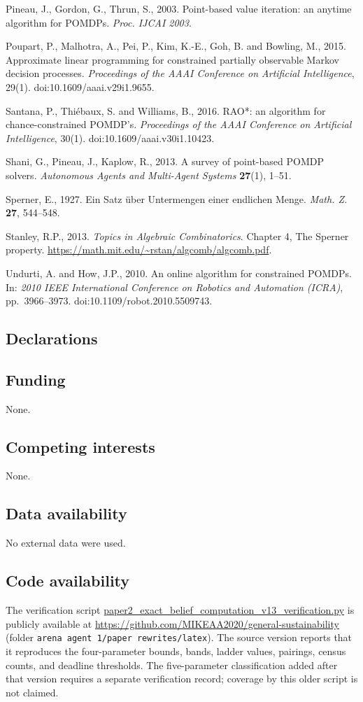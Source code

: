 \documentclass[10pt,twocolumn]{article}
\theoremstyle{plain}
\theoremstyle{definition}
\theoremstyle{remark}
\begin{document}
Pineau, J., Gordon, G., Thrun, S., 2003. Point-based value iteration: an anytime algorithm
for POMDPs. \emph{Proc. IJCAI 2003}.

Poupart, P., Malhotra, A., Pei, P., Kim, K.-E., Goh, B. and Bowling, M., 2015.
Approximate linear programming for constrained partially observable Markov decision
processes. \emph{Proceedings of the AAAI Conference on Artificial Intelligence}, 29(1).
doi:10.1609/aaai.v29i1.9655.

Santana, P., Thi\'ebaux, S. and Williams, B., 2016. RAO*: an algorithm for
chance-constrained POMDP's. \emph{Proceedings of the AAAI Conference on Artificial
Intelligence}, 30(1). doi:10.1609/aaai.v30i1.10423.


Shani, G., Pineau, J., Kaplow, R., 2013. A survey of point-based POMDP solvers.
\emph{Autonomous Agents and Multi-Agent Systems} \textbf{27}(1), 1--51.

Sperner, E., 1927. Ein Satz \"uber Untermengen einer endlichen Menge. \emph{Math. Z.}
\textbf{27}, 544--548.

Stanley, R.P., 2013. \emph{Topics in Algebraic Combinatorics}. Chapter 4, The Sperner
property. \url{https://math.mit.edu/~rstan/algcomb/algcomb.pdf}.

Undurti, A. and How, J.P., 2010. An online algorithm for constrained POMDPs. In:
\emph{2010 IEEE International Conference on Robotics and Automation (ICRA)}, pp.~3966--3973.
doi:10.1109/robot.2010.5509743.


\subsection*{Declarations}

\subsection*{Funding}
None.

\subsection*{Competing interests}
None.

\subsection*{Data availability}
No external data were used.

\subsection*{Code availability}
The verification script
\url{paper2_exact_belief_computation_v13_verification.py} is publicly
available at \url{https://github.com/MIKEAA2020/general-sustainability}
(folder \texttt{arena agent 1/paper rewrites/latex}). The source version reports that it reproduces the four-parameter bounds, bands, ladder values, pairings, census counts, and deadline thresholds. The five-parameter classification added after that version requires a separate verification record; coverage by this older script is not claimed.
\end{document}
